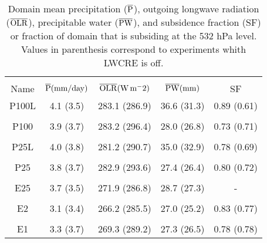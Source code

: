 \documentclass[draft]{agujournal2019}
\begin{document}
\begin{table}
\begin{center}
\caption{Domain mean precipitation ($\overline{\rm{P}}$), outgoing longwave radiation 
($\overline{\rm{OLR}}$), precipitable water ($\overline{\rm{PW}}$), and subsidence fraction (SF)  
or fraction of domain that is subsiding at the 532 hPa level.
Values in parenthesis correspond to experiments whith LWCRE is off.}
    \begin{tabular}{*{5}{c}}
    \hline
    \hline
    \\
 Name &   $\overline{\rm{P}} (\mathrm{mm/day})$ & $\overline{\rm{OLR}} (\rm{W \, m^-2})$ & $\overline{\rm{PW}} (\rm{mm})$ & SF   \\ \hline
  P100L   &  4.1 (3.5)   &  283.1 (286.9)  & 36.6 (31.3)  & 0.89 (0.61)      \\ 
    \\
  P100 &   3.9 (3.7)   &  283.2 (296.4)  & 28.0 (26.8) & 0.73 (0.71)           \\  
    \\
  P25L &   4.0 (3.8)  &  281.2 (290.7)   & 35.0 (32.9) & 0.78 (0.69)          \\  
    \\
  P25  &   3.8 (3.7)    & 282.9 (293.6)   & 27.4 (26.4) & 0.80 (0.72)          \\  
    \\
 E25  & 3.7 (3.5)    &   271.9 (286.8)   & 28.7 (27.3) & -            \\  
    \\
 E2   &  3.1 (3.4)   &  266.2 (285.5)    & 27.0 (25.2) & 0.83 (0.77)           \\ 
    \\
 E1   &  3.3 (3.7)   &  269.3 (289.2)    & 27.3 (26.5) & 0.78 (0.78)         \\  \hline

    \end{tabular}\par
    \label{tab:lambda}
\end{center}
\end{table}
\end{document}
